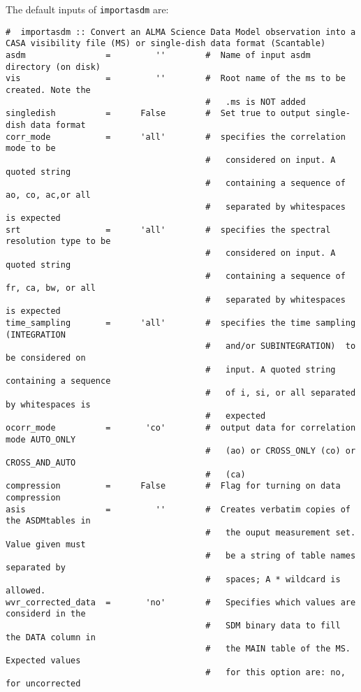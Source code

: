 The default inputs of {\tt importasdm} are:

\small
\begin{verbatim}
#  importasdm :: Convert an ALMA Science Data Model observation into a
CASA visibility file (MS) or single-dish data format (Scantable)
asdm                =         ''        #  Name of input asdm directory (on disk)
vis                 =         ''        #  Root name of the ms to be created. Note the
                                        #   .ms is NOT added
singledish          =      False        #  Set true to output single-dish data format
corr_mode           =      'all'        #  specifies the correlation mode to be
                                        #   considered on input. A quoted string
                                        #   containing a sequence of ao, co, ac,or all
                                        #   separated by whitespaces is expected
srt                 =      'all'        #  specifies the spectral resolution type to be
                                        #   considered on input. A quoted string
                                        #   containing a sequence of fr, ca, bw, or all
                                        #   separated by whitespaces is expected
time_sampling       =      'all'        #  specifies the time sampling (INTEGRATION
                                        #   and/or SUBINTEGRATION)  to be considered on
                                        #   input. A quoted string containing a sequence
                                        #   of i, si, or all separated by whitespaces is
                                        #   expected
ocorr_mode          =       'co'        #  output data for correlation mode AUTO_ONLY
                                        #   (ao) or CROSS_ONLY (co) or CROSS_AND_AUTO
                                        #   (ca)
compression         =      False        #  Flag for turning on data compression
asis                =         ''        #  Creates verbatim copies of the ASDMtables in
                                        #   the ouput measurement set.  Value given must
                                        #   be a string of table names separated by
                                        #   spaces; A * wildcard is allowed.
wvr_corrected_data  =       'no'        #   Specifies which values are considerd in the
                                        #   SDM binary data to fill the DATA column in
                                        #   the MAIN table of the MS. Expected values
                                        #   for this option are: no, for uncorrected

\end{verbatim}
